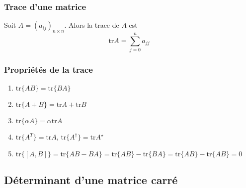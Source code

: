 \subsubsection{Trace d'une matrice}
\noindent
Soit $A = (a_{ij})_{n \times n}$. Alors la trace de $A$ est
\[ \text{tr} A =  \sum_{j = 0}^{n} a_{jj} \]

\subsubsection{Propriétés de la trace}
\begin{enumerate}
    \item $\text{tr}\{ AB \} = \text{tr}\{ BA \}$
    \item $\text{tr}\{ A + B \} = \text{tr}A + \text{tr}B$
    \item $\text{tr}\{ \alpha A \} = \alpha \text{tr}A $
    \item $\text{tr}\{ A^T \} = \text{tr}A$, $\text{tr}\{ A^\dagger \} = \text{tr}A^\star$
    \item $\text{tr}\{ [A, B] \} = \text{tr}\{ AB - BA \} = \text{tr}\{ AB \} - \text{tr}\{BA\} = \text{tr}\{ AB \} - \text{tr}\{AB\} = 0$
\end{enumerate}

\subsection{Déterminant d'une matrice carré}


